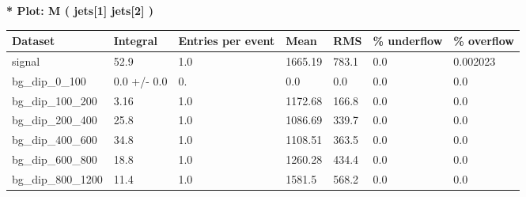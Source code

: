 \documentclass[a4paper, 10pt]{article}
\begin{document}
\textbf{* Plot: M ( jets[1] jets[2] ) }\\
   \begin{table}[H]
  \begin{center}
    \begin{tabular}{|m{23.0mm}|m{23.0mm}|m{18.0mm}|m{19.0mm}|m{19.0mm}|m{19.0mm}|m{19.0mm}|}
      \hline
      {\cellcolor{yellow}         Dataset}& {\cellcolor{yellow}         Integral}& {\cellcolor{yellow}         Entries per event}& {\cellcolor{yellow}         Mean}& {\cellcolor{yellow}         RMS}& {\cellcolor{yellow}         \% underflow}& {\cellcolor{yellow}         \% overflow}\\
      \hline
      {\cellcolor{white}         signal}& {\cellcolor{white}         52.9}& {\cellcolor{white}         1.0}& {\cellcolor{white}         1665.19}& {\cellcolor{white}         783.1}& {\cellcolor{green}         0.0}& {\cellcolor{green}         0.002023}\\
      \hline
      {\cellcolor{white}         bg\_dip\_0\_100}& {\cellcolor{white}         0.0 +/\-- 0.0}& {\cellcolor{white}         0.}& {\cellcolor{white}         0.0}& {\cellcolor{white}         0.0}& {\cellcolor{green}         0.0}& {\cellcolor{green}         0.0}\\
      \hline
      {\cellcolor{white}         bg\_dip\_100\_200}& {\cellcolor{white}         3.16}& {\cellcolor{white}         1.0}& {\cellcolor{white}         1172.68}& {\cellcolor{white}         166.8}& {\cellcolor{green}         0.0}& {\cellcolor{green}         0.0}\\
      \hline
      {\cellcolor{white}         bg\_dip\_200\_400}& {\cellcolor{white}         25.8}& {\cellcolor{white}         1.0}& {\cellcolor{white}         1086.69}& {\cellcolor{white}         339.7}& {\cellcolor{green}         0.0}& {\cellcolor{green}         0.0}\\
      \hline
      {\cellcolor{white}         bg\_dip\_400\_600}& {\cellcolor{white}         34.8}& {\cellcolor{white}         1.0}& {\cellcolor{white}         1108.51}& {\cellcolor{white}         363.5}& {\cellcolor{green}         0.0}& {\cellcolor{green}         0.0}\\
      \hline
      {\cellcolor{white}         bg\_dip\_600\_800}& {\cellcolor{white}         18.8}& {\cellcolor{white}         1.0}& {\cellcolor{white}         1260.28}& {\cellcolor{white}         434.4}& {\cellcolor{green}         0.0}& {\cellcolor{green}         0.0}\\
      \hline
      {\cellcolor{white}         bg\_dip\_800\_1200}& {\cellcolor{white}         11.4}& {\cellcolor{white}         1.0}& {\cellcolor{white}         1581.5}& {\cellcolor{white}         568.2}& {\cellcolor{green}         0.0}& {\cellcolor{green}         0.0}\\

\end{tabular}
\end{center}
\end{table}
\end{document}
